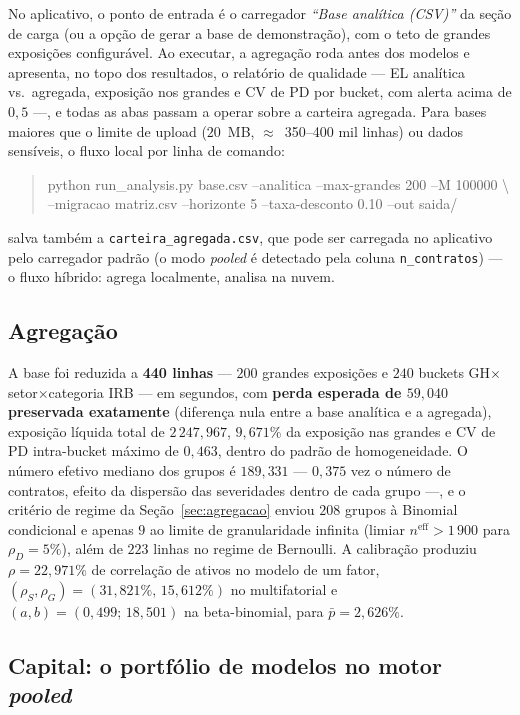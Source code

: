 \documentclass[11pt,a4paper]{article}
\begin{document}
No aplicativo, o ponto de entrada é o carregador \emph{``Base analítica (CSV)''} da seção de carga (ou a opção de gerar a base de demonstração), com o teto de grandes exposições configurável. Ao executar, a agregação roda antes dos modelos e apresenta, no topo dos resultados, o relatório de qualidade --- EL analítica vs.\ agregada, exposição nos grandes e CV de PD por bucket, com alerta acima de $0{,}5$ ---, e todas as abas passam a operar sobre a carteira agregada. Para bases maiores que o limite de upload ($20$~MB, $\approx$~350--400 mil linhas) ou dados sensíveis, o fluxo local por linha de comando:
\begin{quote}\small\ttfamily
python run\_analysis.py base.csv --analitica --max-grandes 200 --M 100000 \textbackslash\\
\hspace*{1em}--migracao matriz.csv --horizonte 5 --taxa-desconto 0.10 --out saida/
\end{quote}
salva também a \texttt{carteira\_agregada.csv}, que pode ser carregada no aplicativo pelo carregador padrão (o modo \emph{pooled} é detectado pela coluna \texttt{n\_contratos}) --- o fluxo híbrido: agrega localmente, analisa na nuvem.

\subsection{Agregação}

A base foi reduzida a \textbf{440 linhas} --- $200$ grandes exposições e $240$ buckets GH$\times$setor$\times$categoria IRB --- em segundos, com \textbf{perda esperada de $59{,}040$ preservada exatamente} (diferença nula entre a base analítica e a agregada), exposição líquida total de $2\,247{,}967$, $9{,}671\%$ da exposição nas grandes e CV de PD intra-bucket máximo de $0{,}463$, dentro do padrão de homogeneidade. O número efetivo mediano dos grupos é $189{,}331$ --- $0{,}375$ vez o número de contratos, efeito da dispersão das severidades dentro de cada grupo ---, e o critério de regime da Seção~\ref{sec:agregacao} enviou $208$ grupos à Binomial condicional e apenas $9$ ao limite de granularidade infinita (limiar $n^{\mathrm{eff}}>1\,900$ para $\rho_D=5\%$), além de $223$ linhas no regime de Bernoulli. A calibração produziu $\rho=22{,}971\%$ de correlação de ativos no modelo de um fator, $(\rho_S,\rho_G)=(31{,}821\%,\,15{,}612\%)$ no multifatorial e $(a,b)=(0{,}499;\,18{,}501)$ na beta-binomial, para $\bar p=2{,}626\%$.

\subsection{Capital: o portfólio de modelos no motor \emph{pooled}}
\end{document}
